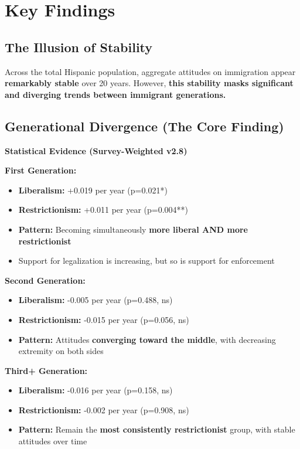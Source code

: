 \documentclass[11pt,letterpaper]{article}
\begin{document}
\section{Key Findings}

\subsection{The Illusion of Stability}

Across the total Hispanic population, aggregate attitudes on immigration appear \textbf{remarkably stable} over 20 years. However, \textbf{this stability masks significant and diverging trends between immigrant generations.}

\subsection{Generational Divergence (The Core Finding)}

\textbf{Statistical Evidence (Survey-Weighted v2.8)}

\textbf{First Generation:}
\begin{itemize}
    \item \textbf{Liberalism:} +0.019 per year (p=0.021*)
    \item \textbf{Restrictionism:} +0.011 per year (p=0.004**)
    \item \textbf{Pattern:} Becoming simultaneously \textbf{more liberal AND more restrictionist}
    \item Support for legalization is increasing, but so is support for enforcement
\end{itemize}

\textbf{Second Generation:}
\begin{itemize}
    \item \textbf{Liberalism:} -0.005 per year (p=0.488, ns)
    \item \textbf{Restrictionism:} -0.015 per year (p=0.056, ns)
    \item \textbf{Pattern:} Attitudes \textbf{converging toward the middle}, with decreasing extremity on both sides
\end{itemize}

\textbf{Third+ Generation:}
\begin{itemize}
    \item \textbf{Liberalism:} -0.016 per year (p=0.158, ns)
    \item \textbf{Restrictionism:} -0.002 per year (p=0.908, ns)
    \item \textbf{Pattern:} Remain the \textbf{most consistently restrictionist} group, with stable attitudes over time
\end{itemize}
\end{document}
